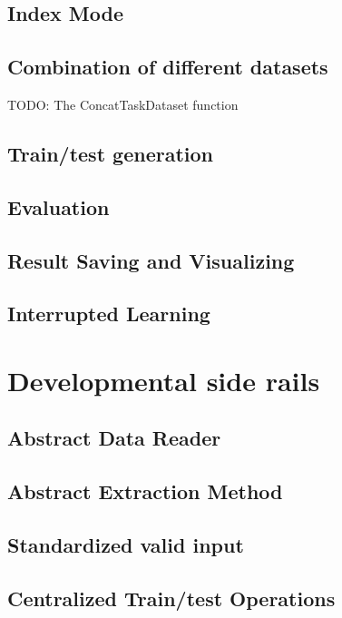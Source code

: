 \subsection{Index Mode}

\subsection{Combination of different datasets}
TODO: The ConcatTaskDataset function

\subsection{Train/test generation}

\subsection{Evaluation}

\subsection{Result Saving and Visualizing}

\subsection{Interrupted Learning}

\section{Developmental side rails}

\subsection{Abstract Data Reader}

\subsection{Abstract Extraction Method}

\subsection{Standardized valid input}

\subsection{Centralized Train/test Operations}